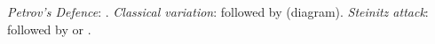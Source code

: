 \emph{Petrov's Defence}: .
\emph{Classical variation}:  followed by  (diagram).
\emph{Steinitz attack}:  followed by  or .